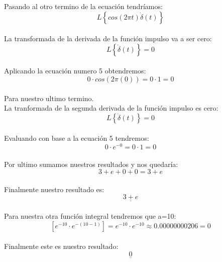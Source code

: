 \documentclass[a4paper,openright,12pt]{report}
\begin{document}
Pasando al otro termino de la ecuación tendríamos:
\begin{equation}
L\left \{ cos(2\pi t)\dot{\delta }(t) \right \}
\end{equation}\\
La transformada de la derivada de la función impulso va a ser cero:
\begin{equation}
L\left \{ \dot{\delta }(t) \right \}=0
\end{equation}\\
Aplicando la ecuación numero 5 obtendremos:
\begin{equation}
0\cdot cos(2\pi (0))=0\cdot 1=0
\end{equation}\\
Para nuestro ultimo termino.\\
La tranformada de la segunda derivada de la función impulso es cero:
\begin{equation}
L\left \{ \ddot{\delta }(t) \right \}=0
\end{equation}\\
Evaluando con base a la ecuación 5 tendremos:
\begin{equation}
0\cdot e^{-0}=0\cdot 1=0
\end{equation}\\
Por ultimo sumamos nuestros resultados y nos quedaría:
\begin{equation}
3+e+0+0=3+e
\end{equation}\\
Finalmente nuestro resultado es:
\begin{equation}
\underline{3+e}
\end{equation}\\

Para nuestra otra función integral tendremos que a=10:
\begin{equation}
\left [ e^{-10}\cdot e^{-(10-1)} \right ]=e^{-10}\cdot e^{-10}\approx 0.00000000206= 0
\end{equation}\\
Finalmente este es nuestro resultado:
\begin{equation}
\underline{0}
\end{equation}\\
\end{document}
